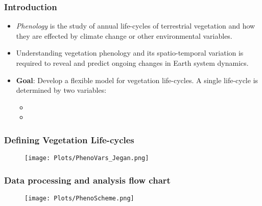 \documentclass{beamer}
\begin{document}



\begin{frame}
\frametitle{Introduction}
\begin{itemize}
\item \emph{Phenology} is the study of annual life-cycles of terrestrial vegetation and how they are effected by climate change or other environmental variables. 

\item Understanding vegetation phenology and its spatio-temporal variation is required to reveal and predict ongoing changes in Earth system dynamics. \\[0.5cm]

\item \textbf{Goal}: Develop a flexible model for vegetation life-cycles.  A single life-cycle is determined by two variables: 
\begin{itemize} 
\item  
\item 
\end{itemize}
\end{itemize}
\end{frame}

\frame
{
\frametitle{Defining Vegetation Life-cycles}
\begin{figure}
   \begin{center}
   \texttt{[image: Plots/PhenoVars\_Jegan.png]} 
\end{center}
\end{figure}
}

\frame
{
\frametitle{Data processing and analysis flow chart }
\begin{figure} %
   \begin{center}
   \texttt{[image: Plots/PhenoScheme.png]} 
   \end{center}
\end{figure}
}
\end{document}
